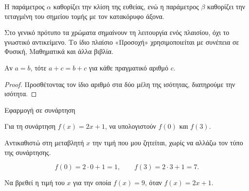 Η παράμετρος \(\alpha\) καθορίζει την κλίση της ευθείας, ενώ η παράμετρος \(\beta\) καθορίζει την τεταγμένη του σημείου τομής με τον κατακόρυφο άξονα.
\begin{AttentionBox}
Στο γενικό πρότυπο τα χρώματα σημαίνουν τη λειτουργία ενός πλαισίου, όχι το γνωστικό αντικείμενο. Το ίδιο πλαίσιο «Προσοχή» χρησιμοποιείται με συνέπεια σε Φυσική, Μαθηματικά και άλλα βιβλία.
\end{AttentionBox}
\begin{theorembox}
Αν \(a=b\), τότε \(a+c=b+c\) για κάθε πραγματικό αριθμό \(c\).
\end{theorembox}
\begin{proof}
Προσθέτοντας τον ίδιο αριθμό στα δύο μέλη της ισότητας, διατηρούμε την ισότητα.
\end{proof}
\begin{workedexample}{Εφαρμογή σε συνάρτηση}
\begin{ProblemBox}
Για τη συνάρτηση \(f(x)=2x+1\), να υπολογιστούν \(f(0)\) και \(f(3)\).
\end{ProblemBox}
\begin{ThinkBox}
Αντικαθιστώ στη μεταβλητή \(x\) την τιμή που μου ζητείται, χωρίς να αλλάζω τον τύπο της συνάρτησης.
\end{ThinkBox}
\SolutionHeading
\[f(0)=2\cdot0+1=1,\qquad f(3)=2\cdot3+1=7.\]
\end{workedexample}
\begin{exercise}[MATH-A-001]{}
Να βρεθεί η τιμή του \(x\) για την οποία \(f(x)=9\), όταν \(f(x)=2x+1\).
\end{exercise}
